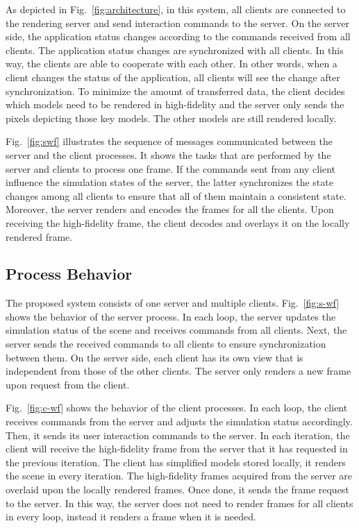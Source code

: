 As depicted in Fig.~\ref{fig:architecture}, in this system, all clients are connected to the rendering server and send interaction commands to the server.
On the server side, the application status changes according to the commands received from all clients. The application status changes are synchronized with all clients. In this way, the clients are able to cooperate with each other. In other words, when a client changes the status of the application, all clients will see the change after synchronization.
To minimize the amount of transferred data, the client decides which models need to be rendered in high-fidelity and the server only sends the pixels depicting those key models. The other models are still rendered locally.

Fig.~\ref{fig:swf} illustrates the sequence of messages communicated between the server and the client processes. It shows the tasks that are performed by the server and clients to process one frame. If the commands sent from any client influence the simulation states of the server, the latter synchronizes the state changes among all clients to ensure that all of them maintain a consistent state. Moreover, the server renders and encodes the frames for all the clients. Upon receiving the high-fidelity frame, the client decodes and overlays it on the locally rendered frame.

\subsection{Process Behavior}

The proposed system consists of one server and multiple clients.
Fig.~\ref{fig:s-wf} shows the behavior of the server process.
In each loop, the server updates the simulation status of the scene and receives commands from all clients.
Next, the server sends the received commands to all clients to ensure synchronization between them.
On the server side, each client has its own view that is independent from those of the other clients.
The server only renders a new frame upon request from the client.

Fig.~\ref{fig:c-wf} shows the behavior of the client processes. In each loop, the client receives commands from the server and adjusts the simulation status accordingly. Then, it sends its user interaction commands to the server. In each iteration, the client will receive the high-fidelity frame from the server that it has requested in the previous iteration. The client has simplified models stored locally, it renders the scene in every iteration. The high-fidelity frames acquired from the server are overlaid upon the locally rendered frames. Once done, it sends the frame request to the server. In this way, the server does not need to render frames for all clients in every loop, instead it renders a frame when it is needed.

